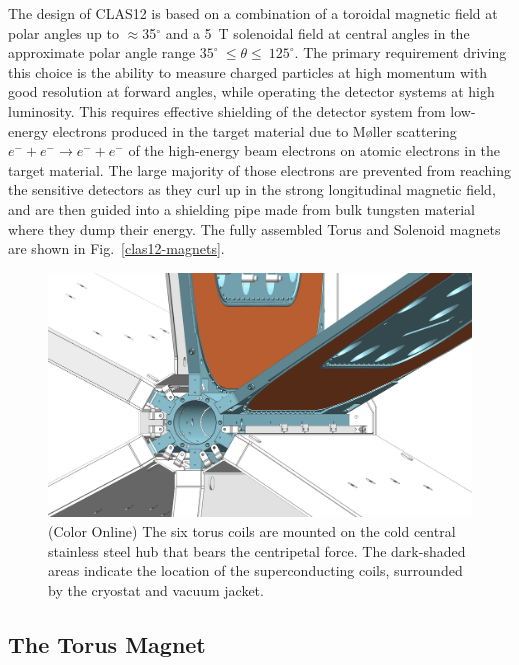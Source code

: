 \documentclass[final,3p,twocolumn]{elsarticle}
\begin{document}
The design of CLAS12 is based on a combination of a toroidal magnetic field at polar angles up to $\approx$35$^\circ$
and a 5~T solenoidal field at central angles in the approximate polar angle range $35^\circ~\le \theta \le~125^\circ$.
The primary requirement driving this choice is the ability to measure charged particles at high momentum with good
resolution at forward angles, while operating the detector systems at high luminosity. This requires effective
shielding of the detector system from low-energy electrons produced in the target material due to M{\o}ller
scattering $e^- + e^- \to e^- + e^-$ of the high-energy beam electrons on atomic electrons in the target material.
The large majority of those electrons are prevented from reaching the sensitive detectors as they curl up in the
strong longitudinal magnetic field, and are then guided into a shielding pipe made from bulk tungsten material where
they dump their energy. The fully assembled Torus and Solenoid magnets are shown in Fig.~\ref{clas12-magnets}.
\begin{figure}[tb!]
\centerline{\includegraphics[width=1.00\columnwidth]{torus-hub-2.png}}
\caption{(Color Online) The six torus coils are mounted on the cold central stainless steel hub that bears the centripetal force. The
dark-shaded areas indicate the location of the superconducting coils, surrounded by the cryostat and vacuum jacket.}
\label{coil-mount}
\end{figure}


\subsection{The Torus Magnet}
\label{torus}
\end{document}
